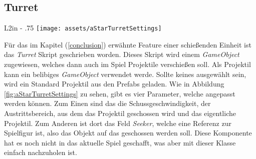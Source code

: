 \subsection*{Turret}
\begin{wrapfigure}[7]{L}{2in - .75\columnsep}
    \vspace{-\intextsep}
    \hspace*{-.75\columnsep}
    \texttt{[image: assets/aStarTurretSettings]}
    \caption{PathRequestManager Settings}
    \label{fig:aStarTurretSettings}
\end{wrapfigure}
Für das im Kapitel  (\ref{conclusion}) erwähnte Feature einer schießenden Einheit ist das \textit{Turret} Skript geschrieben worden. Dieses Skript wird einem \textit{GameObject} zugewiesen, welches dann auch im Spiel Projektile verschie\ss en soll. Als Projektil kann ein belibiges \textit{GameObject} verwendet werde. Sollte keines ausgewählt sein, wird ein Standard Projektil aus den Prefabs geladen. Wie in Abbildung \ref{fig:aStarTurretSettings} zu sehen, gibt es vier Parameter, welche angepasst werden können. Zum Einen sind das die Schussgeschwindigkeit, der Austrittsbereich, aus dem das Projektil geschossen wird und das eigentliche Projektil. Zum Anderen ist dort das Feld \textit{Seeker}, welche eine Referenz zur Spielfigur ist, also das Objekt auf das geschossen werden soll. Diese Komponente hat es noch nicht in das aktuelle Spiel geschafft, was aber mit dieser Klasse einfach nachzuholen ist.
